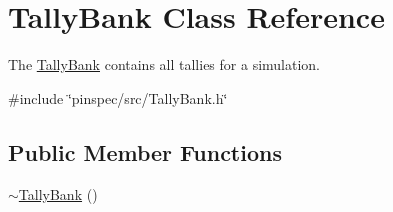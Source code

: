 \hypertarget{classTallyBank}{\section{Tally\-Bank Class Reference}
\label{classTallyBank}
}


The \hyperlink{classTallyBank}{Tally\-Bank} contains all tallies for a simulation.  




{\ttfamily \#include \char`\"{}pinspec/src/\-Tally\-Bank.\-h\char`\"{}}

\subsection*{Public Member Functions}
\begin{DoxyCompactItemize}
\item 
\hypertarget{classTallyBank_ac5fa620ccaee14fe52f95a82a832f6fb}{\hyperlink{classTallyBank_ac5fa620ccaee14fe52f95a82a832f6fb}{$\sim$\-Tally\-Bank} ()}\label{classTallyBank_ac5fa620ccaee14fe52f95a82a832f6fb}


\end{DoxyCompactItemize}
